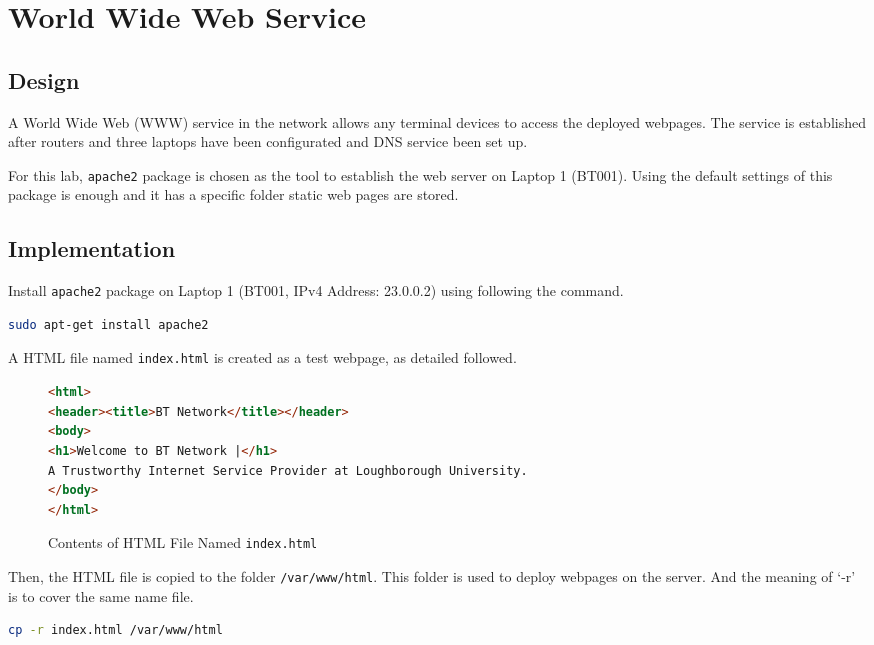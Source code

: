 \section{World Wide Web Service}
\label{sec:web}

\subsection{Design}

A World Wide Web (WWW) service in the network allows any terminal devices to access the deployed webpages. The service is established after routers and three laptops have been configurated and DNS service been set up.

For this lab, \texttt{apache2} package is chosen as the tool to establish the web server on Laptop 1 (BT001). 
Using the default settings of this package is enough and it has a specific folder static web pages are stored. 


\subsection{Implementation}

Install \texttt{apache2} package on Laptop 1 (BT001, IPv4 Address: 23.0.0.2) using following the command.

\begin{lstlisting}[language=sh]
sudo apt-get install apache2

\end{lstlisting}

A HTML file named \texttt{index.html} is created as a test webpage, as detailed followed.

\begin{figure*}[ht!]
\begin{lstlisting}[language=html]
<html>
<header><title>BT Network</title></header>
<body>
<h1>Welcome to BT Network |</h1>
A Trustworthy Internet Service Provider at Loughborough University.
</body>
</html>
\end{lstlisting}
\caption{Contents of HTML File Named \texttt{index.html}}
\end{figure*}

Then, the HTML file is copied to the folder \texttt{/var/www/html}. This folder is used to deploy webpages on the server. And the meaning of ‘-r’ is to cover the same name file. 

\begin{lstlisting}[language=sh]
cp -r index.html /var/www/html
\end{lstlisting}

